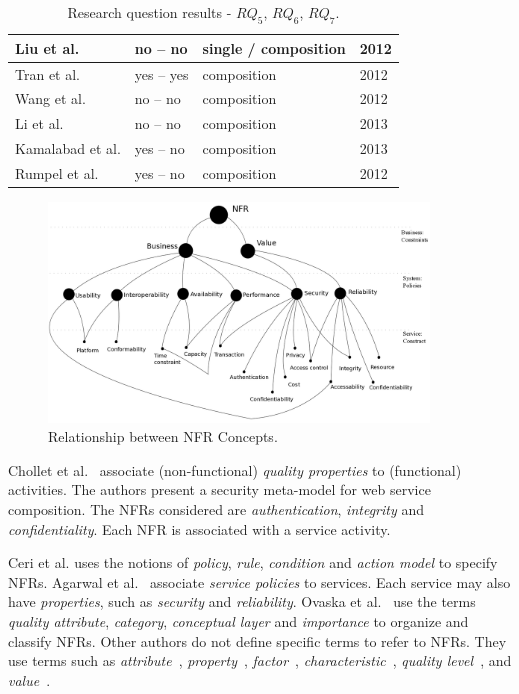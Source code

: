 \documentclass[english,12pt]{article}
\begin{document}
\begin{table}[ht!]
\begin{tabular}{l|l|l|l}
  \hline
   Liu et al. \cite{Liu20121080}  & no -- no & single / composition  &  
  2012\\
  \hline
  Tran et al. \cite{Tran2012531} & yes -- yes  & composition &  2012\\
  \hline
    Wang et al. \cite{Wang2012} & no -- no & composition &  2012 \\
  \hline
   Li et al. \cite{Li2013} & no -- no & composition 
  & 2013\\
  \hline
    Kamalabad et al. \cite{Kamalabad2012} & yes -- no &  composition 
  & 2013\\
  \hline
   Rumpel et al. \cite{Rumpel2012}  & yes -- no  & composition  & 2012\\
  \hline
  \hline  
\end{tabular}
\caption{Research question results - $RQ_5$, $RQ_6$, $RQ_7$.}
\label{tab:result03}
\end{table} 

\begin{figure}[ht!]  
\centering  
\includegraphics[width=0.90\textwidth]{figs/nfrRelationship.png}
\caption{Relationship between  NFR Concepts.}
\label{fig:nfr-relationship}   
\end{figure}  


Chollet et al.~\cite{CholletL09} associate (non-functional) \textit{quality properties} to 
(functional) activities. The authors present a security meta-model for web service
composition. The NFRs considered are \textit{authentication}, \textit{integrity} and \textit{confidentiality}. Each NFR is associated with a service activity.


Ceri et al.\cite{CeriDMF07} uses the notions of \textit{policy}, \textit{rule}, \textit{condition} and \textit{action model} to specify NFRs.
Agarwal et al.~\cite{AgarwalLS09} associate \textit{service policies} to services. 
Each service may also have \textit{properties}, such as \textit{security} and \textit{reliability}. 
Ovaska et al.~\cite{OvaskaEHPA10} use the terms \textit{quality attribute}, \textit{category}, \textit{conceptual layer} and \textit{importance} to organize and classify NFRs.
Other authors do not define specific terms to refer to NFRs. 
They use terms such as \textit{attribute}~\cite{ZhangPSP05,BasinDL06,JeongCL09}, 
\textit{property}~\cite{Fabra2011}, 
\textit{factor}~\cite{MohantyRP10,GutierrezRF10}, 
\textit{characteristic}~\cite{DiamadopoulouMPS08}, 
\textit{quality level}~\cite{ModicaTV09}, and
\textit{value}~\cite{ThissenW06,BasinDL06}.
\end{document}
